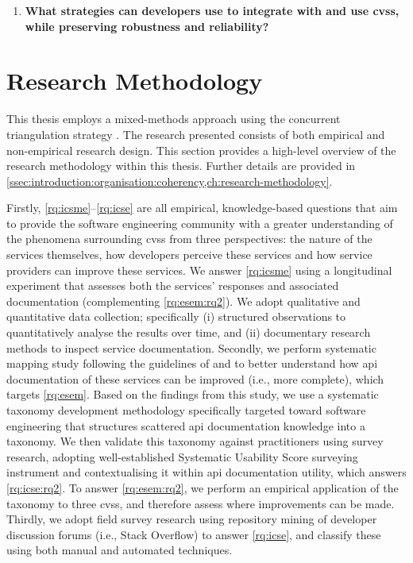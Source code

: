 \begin{leftbar}
\begin{enumerate}[label=\faQuestionCircle~~\textbf{RQ\arabic*.}, ref=RQ\arabic*, leftmargin=2.75\parindent, rightmargin=1\parindent,start=4]
  \item \textbf{What strategies can developers use to integrate with and use \glspl{cvs}, while preserving robustness and reliability?}\label{rq:fse}%
\end{enumerate}
\end{leftbar}

\section{Research Methodology}

This thesis employs a mixed-methods approach using the concurrent triangulation strategy \citep{Jick:1979el,Bratthall2002}. The research presented consists of both empirical and non-empirical research design. This section provides a high-level overview of the research methodology within this thesis. Further details are provided in  \cref{ssec:introduction:organisation:coherency,ch:research-methodology}.

Firstly, \ref{rq:icsme}--\ref{rq:icse} are all empirical, knowledge-based questions \citep{Easterbrook:2007ws,Meltzoff:1998wg} that aim to provide the software engineering community with a greater understanding of the phenomena surrounding \glspl{cvs} from three perspectives: the nature of the services themselves, how developers perceive these services and how service providers can improve these services.  We answer \ref{rq:icsme} using a longitudinal experiment that assesses both the services' responses and associated documentation (complementing \ref{rq:esem:rq2}). We adopt qualitative and quantitative data collection; specifically (i) structured observations to quantitatively analyse the results over time, and (ii) documentary research methods to inspect service documentation.
Secondly, we perform systematic mapping study following the guidelines of \citet{Kitchenham:2007dd} and \citet{Petersen:2008td} to better understand how \gls{api} documentation of these services can be improved (i.e., more complete), which targets \cref{rq:esem}. Based on the findings from this study, we use a systematic taxonomy development methodology specifically targeted toward software engineering \citep{Usman:2017hn} that structures scattered \gls{api} documentation knowledge into a taxonomy. We then validate this taxonomy against practitioners using survey research, adopting \citeauthor{Brooke:1996ua} well-established Systematic Usability Score \citep{Brooke:1996ua} surveying instrument and contextualising it within \gls{api} documentation utility, which answers \ref{rq:icse:rq2}. To answer \ref{rq:esem:rq2}, we perform an empirical application of the taxonomy to three \glspl{cvs}, and therefore assess where improvements can be made.
Thirdly, we adopt field survey research using repository mining of developer discussion forums (i.e., Stack Overflow) to answer \ref{rq:icse}, and classify these using both manual and automated techniques.

